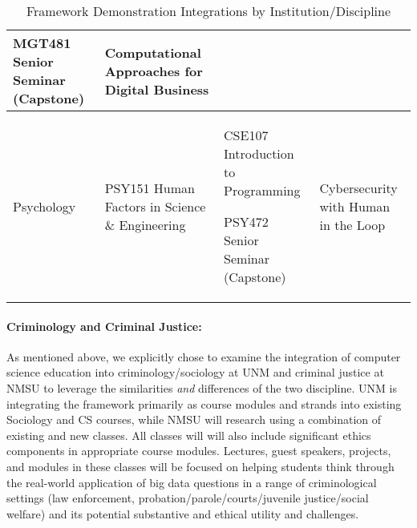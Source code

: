 \begin{table}[tbh!]
\begin{tabular}{|p{1in}|p{1.75in}|p{1.5in}|p{1.5in}|}
                    MGT481 Senior Seminar (Capstone)
                    & Computational Approaches for Digital Business\\
     \hline
     Psychology 
                    & PSY151 Human Factors in Science \& Engineering  
                    & CSE107 Introduction to Programming
                    
                    PSY472 Senior Seminar (Capstone)
                    & Cybersecurity with Human in the Loop\\
\hline\hline
\end{tabular}
\caption{Framework Demonstration Integrations by Institution/Discipline}
\label{tab:pilots}
\end{table}

\paragraph{Criminology and Criminal Justice:} As mentioned above, we explicitly chose to examine the integration of computer science education into criminology/sociology at UNM and criminal justice at NMSU to leverage the similarities \emph{and} differences of the two discipline. UNM is integrating the framework primarily as course modules and strands into existing Sociology and CS courses, while NMSU will research using a combination of existing and new classes. All classes will will also include significant ethics components in appropriate course modules. Lectures, guest speakers, projects, and modules in these classes will be focused on helping students think through the real-world application of big data questions in a range of criminological settings (law enforcement, probation/parole/courts/juvenile justice/social welfare) and its potential substantive and ethical utility and challenges.


